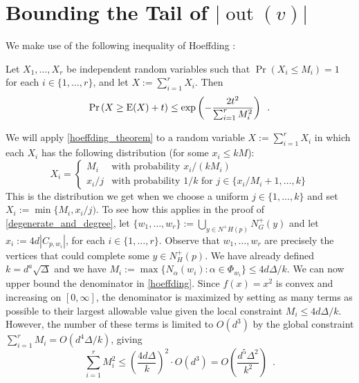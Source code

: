 \documentclass{patmorin}
\DeclareMathOperator{\outn}{out}
\begin{document}




\appendix

\section{Bounding the Tail of \texorpdfstring{\boldmath$|\outn(v)|$}{out(v)}}

We make use of the following inequality of Hoeffding \cite[??]{boucheron.lugosi.ea:concentration}:

\begin{thm}\label{hoeffding_theorem}
  Let $X_1,\ldots,X_r$ be independent random variables such that $\Pr(X_i\le M_i)=1$ for each $i\in\{1,\ldots,r\}$, and let $X:=\sum_{i=1}^r X_i$. Then
  \begin{equation}
    \Pr\left(X \ge \mathrm{E}(X)+ t\right)
      \le \exp\left(-\frac{2t^2}{\sum_{i=1}^r M_i^2}\right) \enspace . \label{hoeffding}
  \end{equation}
\end{thm}
We will apply \cref{hoeffding_theorem} to a random variable $X:=\sum_{i=1}^r X_i$ in which each $X_i$ has the following distribution (for some $x_i\le kM$):
\[
  X_i = \begin{cases}
          M_i & \text{with probability $x_i/(kM_i)$} \\
          x_i/j & \text{with probability $1/k$ for $j\in\{x_i/M_i+1,\ldots,k\}$}
        \end{cases}
\]
This is the distribution we get when we choose a uniform $j\in\{1,\ldots,k\}$ and set $X_i:=\min\{M_i,x_i/j)$.  To see how this applies in the proof of \cref{degenerate_and_degree}, let $\{w_1,\ldots,w_r\}:=\bigcup_{y\in N^+H(p)} N^+_G(y)$ and let $x_i:=4d|C_{p,w_i}|$, for each $i\in\{1,\ldots,r\}$.
Observe that $w_1,\ldots,w_r$ are precisely the vertices that could complete some $y\in N^+_H(p)$.  We have already defined $k=d^a\sqrt{\Delta}$ and we have $M_i:=\max\{N_\alpha(w_i):\alpha \in \Phi_{w_i}\}\le 4d\Delta/k$.  We can now upper bound the denominator in \cref{hoeffding}.  Since $f(x)=x^2$ is convex and increasing on $[0,\infty]$, the denominator is maximized by setting as many terms as possible to their largest allowable value given the local constraint $M_i \le 4d\Delta/k$.  However, the number of these terms is limited to $O(d^3)$ by the global constraint $\sum_{i=1}^r M_i= O(d^4\Delta/k)$, giving
\[
    \sum_{i=1}^r M_i^2 \le \left(\frac{4d\Delta}{k}\right)^2\cdot O(d^3) = O\left(\frac{d^5\Delta^2}{k^2}\right) \enspace .
\]
\end{document}
